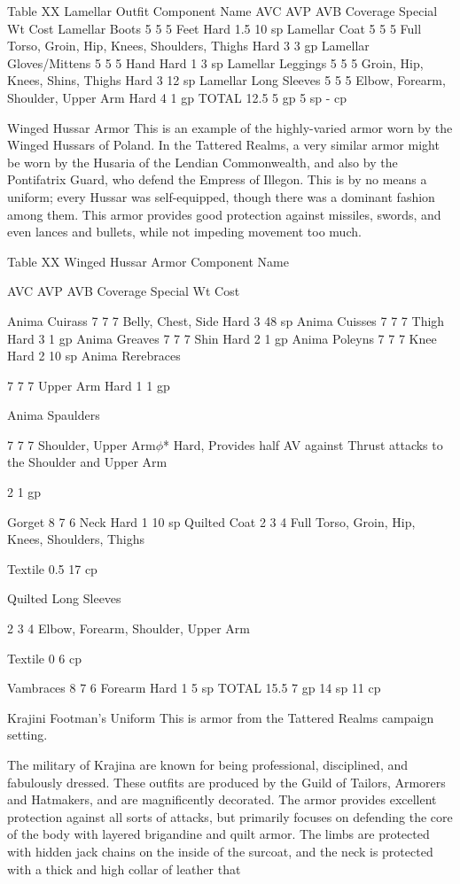 \documentclass[oneside,11pt,english]{book}
\begin{document}
 
Table XX Lamellar Outfit 
Component Name AVC AVP AVB Coverage Special Wt Cost 
Lamellar Boots 5 5 5 Feet Hard 1.5 10 sp 
Lamellar Coat 5 5 5 Full Torso, Groin, Hip, Knees, Shoulders, Thighs Hard 3 3 gp 
Lamellar Gloves/Mittens 5 5 5 Hand Hard 1 3 sp 
Lamellar Leggings 5 5 5 Groin, Hip, Knees, Shins, Thighs Hard 3 12 sp 
Lamellar Long Sleeves 5 5 5 Elbow, Forearm, Shoulder, Upper Arm Hard 4 1 gp 
TOTAL 12.5 5 gp 
5 sp 
- cp 

 


Winged Hussar Armor 
This is an example of the highly-varied armor worn by the Winged Hussars of Poland. In the Tattered 
Realms, a very similar armor might be worn by the Husaria of the Lendian Commonwealth, and also by 
the Pontifatrix Guard, who defend the Empress of Illegon. This is by no means a uniform; every Hussar 
was self-equipped, though there was a dominant fashion among them. This armor provides good 
protection against missiles, swords, and even lances and bullets, while not impeding movement too much. 

 
Table XX Winged Hussar Armor 
Component 
Name 

AVC AVP AVB Coverage Special Wt Cost 

Anima Cuirass 7 7 7 Belly, Chest, Side Hard 3 48 
sp 
Anima Cuisses 7 7 7 Thigh Hard 3 1 gp 
Anima Greaves 7 7 7 Shin Hard 2 1 gp 
Anima Poleyns 7 7 7 Knee Hard 2 10 
sp 
Anima 
Rerebraces 

7 7 7 Upper Arm Hard 1 1 gp 

Anima 
Spaulders 

7 7 7 Shoulder, Upper Arm$\phi$* Hard, Provides half AV against Thrust 
attacks to the Shoulder and Upper Arm 

2 1 gp 

Gorget 8 7 6 Neck Hard 1 10 
sp 
Quilted Coat 2 3 4 Full Torso, Groin, Hip, 
Knees, Shoulders, Thighs 

Textile 0.5 17 
cp 

Quilted Long 
Sleeves 

2 3 4 Elbow, Forearm, Shoulder, 
Upper Arm 

Textile 0 6 cp 

Vambraces 8 7 6 Forearm Hard 1 5 sp 
TOTAL 15.5 7 gp 
14 
sp 
11 
cp 

 

Krajini Footman's Uniform 
This is armor from the Tattered Realms campaign setting. 

 

The military of Krajina are known for being professional, disciplined, and fabulously dressed. These 
outfits are produced by the Guild of Tailors, Armorers and Hatmakers, and are magnificently decorated. 
The armor provides excellent protection against all sorts of attacks, but primarily focuses on defending 
the core of the body with layered brigandine and quilt armor. The limbs are protected with hidden jack 
chains on the inside of the surcoat, and the neck is protected with a thick and high collar of leather that 
\end{document}
